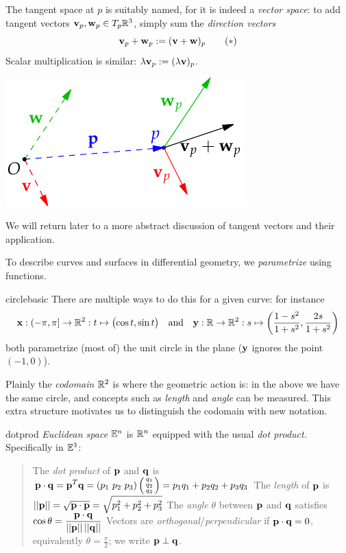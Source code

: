 \begin{minipage}[t]{0.6\linewidth}\vspace{0pt}
	The tangent space at $p$ is suitably named, for it is indeed a \emph{vector space}: to add tangent vectors ${\mathbf{v}}_p,{\mathbf{w}}_p\in T_p\mathbb{R}^3$, simply sum the \emph{direction vectors}
	\[{\mathbf{v}}_p+{\mathbf{w}}_p:=({\mathbf{v}}+{\mathbf{w}})_p\tag{$\ast$}\]
	Scalar multiplication is similar: $\lambda{\mathbf{v}}_p:=(\lambda{\mathbf{v}})_p$. 
\end{minipage}
\hfill
\begin{minipage}[t]{0.39\linewidth}\vspace{0pt}
	\flushright\includegraphics{euclid-tanvec2}
\end{minipage}


We will return later to a more abstract discussion of tangent vectors and their application.



To describe curves and surfaces in differential geometry, we \emph{parametrize} using functions.

\begin{example}{}{circlebasic}
	There are multiple ways to do this for a given curve: for instance
	\[
		{\mathbf{x}}:(-\pi,\pi]\to \mathbb{R}^2: t\mapsto \bigl(\cos t,\sin t\bigr)\quad \text{and} \quad{\mathbf{y}}:\mathbb{R}\to\mathbb{R}^2:s\mapsto \left(\frac{1-s^2}{1+s^2},\frac{2s}{1+s^2}\right)
	\]
	both parametrize (most of) the unit circle in the plane (${\mathbf{y}}$ ignores the point $(-1,0)$).
\end{example}

Plainly the \emph{codomain} $\mathbb{R}^2$ is where the geometric action is: in the above we have the same circle, and concepts such as \emph{length} and \emph{angle} can be measured. This extra structure motivates us to distinguish the codomain with new notation.

\begin{defn}{}{dotprod}
	\emph{Euclidean space} $\mathbb{E}^n$ is $\mathbb{R}^n$ equipped with the usual \emph{dot product.} Specifically in $\mathbb{E}^3$:
	\begin{quote}
		The \emph{dot product} of ${\mathbf{p}}$ and ${\mathbf{q}}$ is $\displaystyle\vp\cdot\vq=\vp^T\vq=(p_1\ p_2\ p_3)\sthreevec{q_1}{q_2}{q_3}=p_1q_1+p_2q_2+p_3q_3$\smallbreak
		The \emph{length} of ${\mathbf{p}}$ is $\displaystyle\left| \left| {\mathbf{p}}\right|\right|=\sqrt{{\mathbf{p}}\cdot{\mathbf{p}}}=\sqrt{p_1^2+p_2^2+p_3^2}$\smallbreak
		The \emph{angle} $\theta$ between ${\mathbf{p}}$ and ${\mathbf{q}}$ satisfies $\displaystyle\cos\theta=\smash[t]{\frac{{\mathbf{p}}\cdot{\mathbf{q}}}{\left| \left| {\mathbf{p}}\right|\right|\left| \left| {\mathbf{q}}\right|\right|}}$\smallbreak
		Vectors are \emph{orthogonal}/\emph{perpendicular} if ${\mathbf{p}}\cdot{\mathbf{q}}=0$, equivalently $\theta=\frac\pi 2$; we write ${\mathbf{p}}\perp{\mathbf{q}}$.
	\end{quote}
\end{defn}


